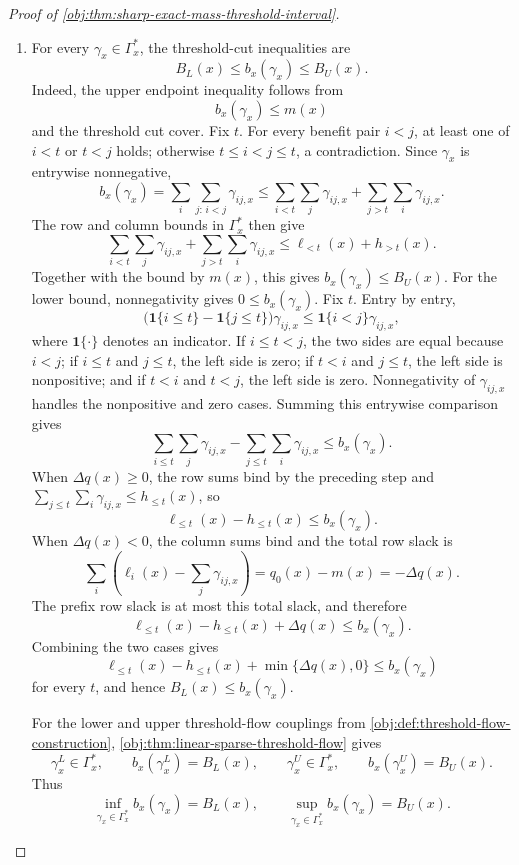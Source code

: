 \begin{proof}[Proof of \cref{obj:thm:sharp-exact-mass-threshold-interval}]
\begin{enumerate}
\item For every \(\gamma_x\in\Gamma_x^\ast\), the threshold-cut inequalities are
\[
B_L(x)\le b_x(\gamma_x)\le B_U(x).
\]
Indeed, the upper endpoint inequality follows from
\[
b_x(\gamma_x)
\le m(x)
\]
and the threshold cut cover.  Fix \(t\).  For every benefit pair \(i<j\), at least one of \(i<t\) or \(t<j\) holds; otherwise \(t\le i<j\le t\), a contradiction.  Since \(\gamma_x\) is entrywise nonnegative,
\[
b_x(\gamma_x)
=
\sum_i\sum_{j:\,i<j}\gamma_{ij,x}
\le
\sum_{i<t}\sum_j\gamma_{ij,x}
+
\sum_{j>t}\sum_i\gamma_{ij,x}.
\]
The row and column bounds in \(\Gamma_x^\ast\) then give
\[
\sum_{i<t}\sum_j\gamma_{ij,x}
+
\sum_{j>t}\sum_i\gamma_{ij,x}
\le
\ell_{<t}(x)+h_{>t}(x).
\]
Together with the bound by \(m(x)\), this gives \(b_x(\gamma_x)\le B_U(x)\).  For the lower bound, nonnegativity gives \(0\le b_x(\gamma_x)\).  Fix \(t\).  Entry by entry,
\[
\bigl(\mathbf 1\{i\le t\}-\mathbf 1\{j\le t\}\bigr)\gamma_{ij,x}
\le
\mathbf 1\{i<j\}\gamma_{ij,x},
\]
where \(\mathbf 1\{\cdot\}\) denotes an indicator.  If \(i\le t<j\), the two sides are equal because \(i<j\); if \(i\le t\) and \(j\le t\), the left side is zero; if \(t<i\) and \(j\le t\), the left side is nonpositive; and if \(t<i\) and \(t<j\), the left side is zero.  Nonnegativity of \(\gamma_{ij,x}\) handles the nonpositive and zero cases.  Summing this entrywise comparison gives
\[
\sum_{i\le t}\sum_j\gamma_{ij,x}
-
\sum_{j\le t}\sum_i\gamma_{ij,x}
\le b_x(\gamma_x).
\]
When \(\Delta q(x)\ge0\), the row sums bind by the preceding step and
\(\sum_{j\le t}\sum_i\gamma_{ij,x}\le h_{\le t}(x)\), so
\[
\ell_{\le t}(x)-h_{\le t}(x)\le b_x(\gamma_x).
\]
When \(\Delta q(x)<0\), the column sums bind and the total row slack is
\[
\sum_i\left(\ell_i(x)-\sum_j\gamma_{ij,x}\right)=q_0(x)-m(x)=-\Delta q(x).
\]
The prefix row slack is at most this total slack, and therefore
\[
\ell_{\le t}(x)-h_{\le t}(x)+\Delta q(x)\le b_x(\gamma_x).
\]
Combining the two cases gives
\[
\ell_{\le t}(x)-h_{\le t}(x)+\min\{\Delta q(x),0\}\le b_x(\gamma_x)
\]
for every \(t\), and hence \(B_L(x)\le b_x(\gamma_x)\).

For the lower and upper threshold-flow couplings from
\cref{obj:def:threshold-flow-construction}, \cref{obj:thm:linear-sparse-threshold-flow} gives
\[
\gamma_x^L\in\Gamma_x^\ast,\qquad b_x(\gamma_x^L)=B_L(x),
\qquad
\gamma_x^U\in\Gamma_x^\ast,\qquad b_x(\gamma_x^U)=B_U(x).
\]
Thus
\[
\inf_{\gamma_x\in\Gamma_x^\ast}b_x(\gamma_x)=B_L(x),
\qquad
\sup_{\gamma_x\in\Gamma_x^\ast}b_x(\gamma_x)=B_U(x).
\] %


\end{enumerate}
\end{proof}

